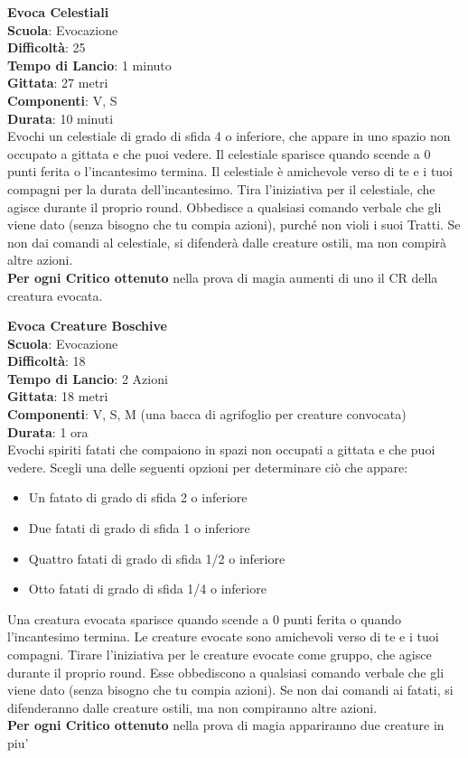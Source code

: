 \begin{multicols}{2}
\medskip\textbf{Evoca Celestiali}\\
\textbf{Scuola}: Evocazione\\
\textbf{Difficoltà}: 25\\
\textbf{Tempo di Lancio}: 1 minuto\\
\textbf{Gittata}: 27 metri\\
\textbf{Componenti}: V, S\\
\textbf{Durata}: 10 minuti\\
Evochi un celestiale di grado di sfida 4 o inferiore, che appare in uno spazio non occupato a gittata e che puoi vedere. Il celestiale sparisce quando scende a 0 punti ferita o l'incantesimo termina. Il celestiale è amichevole verso di te e i tuoi compagni per la durata dell'incantesimo. Tira l'iniziativa per il celestiale, che agisce durante il proprio round. Obbedisce a qualsiasi comando verbale che gli viene dato (senza bisogno che tu compia azioni), purché non violi i suoi Tratti. Se non dai comandi al celestiale, si difenderà dalle creature ostili, ma non compirà altre azioni.\\
\textbf{Per ogni Critico ottenuto} nella prova di magia aumenti di uno il CR della creatura evocata.

\medskip\textbf{Evoca Creature Boschive}\\
\textbf{Scuola}: Evocazione\\
\textbf{Difficoltà}: 18\\
\textbf{Tempo di Lancio}: 2 Azioni\\
\textbf{Gittata}: 18 metri\\
\textbf{Componenti}: V, S, M (una bacca di agrifoglio per creature convocata)\\
\textbf{Durata}: 1 ora \\
Evochi spiriti fatati che compaiono in spazi non occupati a gittata e che puoi vedere. Scegli una delle seguenti opzioni per determinare ciò che appare:
\begin{itemize}
\item Un fatato di grado di sfida 2 o inferiore
\item Due fatati di grado di sfida 1 o inferiore
\item Quattro fatati di grado di sfida 1/2 o inferiore
\item Otto fatati di grado di sfida 1/4 o inferiore
\end{itemize}
\medskip
Una creatura evocata sparisce quando scende a 0 punti ferita o quando l'incantesimo termina. Le creature evocate sono amichevoli verso di te e i tuoi compagni. Tirare l'iniziativa per le creature evocate come gruppo, che agisce durante il proprio round. Esse obbediscono a qualsiasi comando verbale che gli viene dato (senza bisogno che tu compia azioni). Se non dai comandi ai fatati, si difenderanno dalle creature ostili, ma non compiranno altre azioni.\\
\textbf{Per ogni Critico ottenuto} nella prova di magia appariranno due creature in piu'


\end{multicols}
